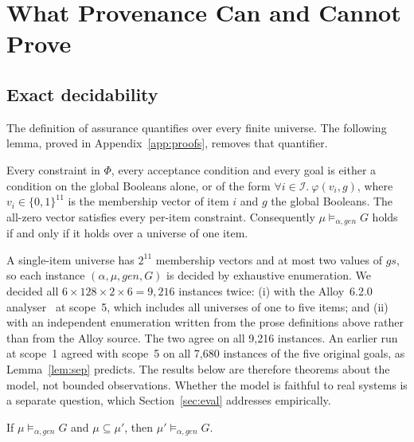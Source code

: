 \section{What Provenance Can and Cannot Prove}\label{sec:results}

\subsection{Exact decidability}

The definition of assurance quantifies over every finite universe. The following lemma,
proved in Appendix~\ref{app:proofs}, removes that quantifier.

\begin{lemma}[Separability]\label{lem:sep}
Every constraint in $\Phi$, every acceptance condition and every goal is either a
condition on the global Booleans alone, or of the form
$\forall i\in\mathcal I.\ \varphi(v_i,g)$, where $v_i\in\{0,1\}^{11}$ is the membership
vector of item $i$ and $g$ the global Booleans. The all-zero vector satisfies every
per-item constraint. Consequently $\mu\models_{\alpha,\mathit{gen}}G$ holds if and only if
it holds over a universe of one item.
\end{lemma}

A single-item universe has $2^{11}$ membership vectors and at most two values of
$\mathit{gs}$, so each instance $(\alpha,\mu,\mathit{gen},G)$ is decided by exhaustive
enumeration. We decided all $6\times 128\times 2\times 6 = 9{,}216$ instances twice:
(i) with the Alloy~6.2.0 analyser~\cite{jackson2019alloy} at scope~5, which includes all
universes of one to five items; and (ii) with an independent enumeration written from the
prose definitions above rather than from the Alloy source. The two agree on all
9,216 instances. An earlier run at scope~1 agreed with scope~5 on all 7,680 instances of
the five original goals, as Lemma~\ref{lem:sep} predicts. The results below are therefore
theorems about the model, not bounded observations. Whether the model is faithful to real
systems is a separate question, which Section~\ref{sec:eval} addresses empirically.

\begin{proposition}[Monotonicity]\label{prop:mono}
If $\mu\models_{\alpha,\mathit{gen}}G$ and $\mu\subseteq\mu'$, then
$\mu'\models_{\alpha,\mathit{gen}}G$.
\end{proposition}

